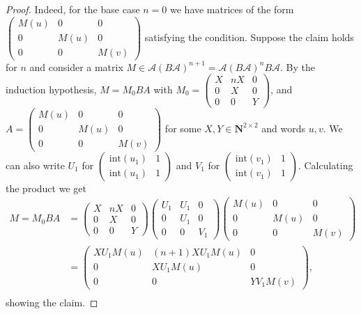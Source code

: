 \documentclass[submission,copyright,creativecommons]{eptcs}
\def\bN{{\mathbf{N}}}
\theoremstyle{plain}
\theoremstyle{definition}
\theoremstyle{remark}
\begin{document}
\begin{proof}
Indeed, for the base case $n=0$ we have matrices of the form $\left(\begin{array}{lll}M(u)&0&0\\0&M(u)&0\\0&0&M(v)\end{array}\right)$
satisfying the condition. Suppose the claim holds for $n$ and consider a matrix $M\in\mathcal{A}(B\mathcal{A})^{n+1}=\mathcal{A}(B\mathcal{A})^nB\mathcal{A}$. By the induction hypothesis, $M=M_0BA$ with $M_0=\left(\begin{array}{lll}X&nX&0\\0&X&0\\0&0&Y\end{array}\right)$,
and $A=\left(\begin{array}{lll}M(u)&0&0\\0&M(u)&0\\0&0&M(v)\end{array}\right)$ for some $X,Y\in\bN^{2\times 2}$ and words $u,v$.
We can also write $U_1$ for $\left(\begin{array}{ll}\mathrm{int}(u_1)&1\\\mathrm{int}(u_1)&1\end{array}\right)$
and $V_1$ for $\left(\begin{array}{ll}\mathrm{int}(v_1)&1\\\mathrm{int}(v_1)&1\end{array}\right)$.
Calculating the product we get
\begin{align*}
M=M_0BA
&=
\left(\begin{array}{lll}X&nX&0\\0&X&0\\0&0&Y\end{array}\right)
\left(\begin{array}{lll}
U_1&U_1&0\\ 0&U_1&0\\ 0&0&V_1
\end{array}\right)
\left(\begin{array}{lll}M(u)&0&0\\0&M(u)&0\\0&0&M(v)\end{array}\right)\\
&=
\left(\begin{array}{lll}XU_1M(u)&(n+1)XU_1M(u)&0\\ 0&XU_1M(u)&0\\ 0&0&YV_1M(v)\end{array}\right),
\\
\end{align*}
showing the claim.


\end{proof}
\end{document}
